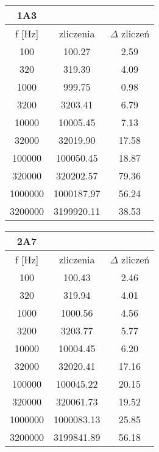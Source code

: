 \begin{appendices}
\begin{table}
\begin{multicols}{3}
\begin{adjustbox}{width=1\linewidth,left}
            \begin{tabular}{|c|c|c|} 
                    \hline 
                    1A3 & & \\ \hline
                    f [Hz] & zliczenia & $\Delta$ zliczeń \\ \hline
                   100 & 100.27 & 2.59\\ \hline 
                   320 & 319.39 & 4.09\\ \hline 
                   1000 & 999.75 & 0.98\\ \hline 
                   3200 & 3203.41 & 6.79\\ \hline 
                   10000 & 10005.45 & 7.13\\ \hline 
                   32000 & 32019.90 & 17.58\\ \hline 
                   100000 & 100050.45 & 18.87\\ \hline 
                   320000 & 320202.57 & 79.36\\ \hline 
                   1000000 & 1000187.97 & 56.24\\ \hline 
                   3200000 & 3199920.11 & 38.53\\ \hline
           \end{tabular}
    \end{adjustbox}

           \begin{adjustbox}{width=1\linewidth,left}

           \begin{tabular}{|c|c|c|}  
            \hline 
            2A7 & & \\ \hline
            f [Hz] & zliczenia & $\Delta$ zliczeń \\ \hline
            100 & 100.43 & 2.46\\ \hline 
            320 & 319.94 & 4.01\\ \hline 
            1000 & 1000.56 & 4.56\\ \hline 
            3200 & 3203.77 & 5.77\\ \hline 
            10000 & 10004.45 & 6.20\\ \hline 
            32000 & 32020.41 & 17.16\\ \hline 
            100000 & 100045.22 & 20.15\\ \hline 
            320000 & 320061.73 & 19.52\\ \hline 
            1000000 & 1000083.13 & 25.85\\ \hline 
            3200000 & 3199841.89 & 56.18\\ \hline
    \end{tabular} \par
\end{adjustbox}


\end{multicols}
\end{table}
\end{appendices}
